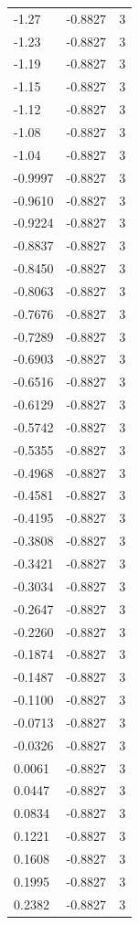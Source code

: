 \begin{longtable}{lrr}
  -1.27 & -0.8827 & 3 \\
  -1.23 & -0.8827 & 3 \\
  -1.19 & -0.8827 & 3 \\
  -1.15 & -0.8827 & 3 \\
  -1.12 & -0.8827 & 3 \\
  -1.08 & -0.8827 & 3 \\
  -1.04 & -0.8827 & 3 \\
  -0.9997 & -0.8827 & 3 \\
  -0.9610 & -0.8827 & 3 \\
  -0.9224 & -0.8827 & 3 \\
  -0.8837 & -0.8827 & 3 \\
  -0.8450 & -0.8827 & 3 \\
  -0.8063 & -0.8827 & 3 \\
  -0.7676 & -0.8827 & 3 \\
  -0.7289 & -0.8827 & 3 \\
  -0.6903 & -0.8827 & 3 \\
  -0.6516 & -0.8827 & 3 \\
  -0.6129 & -0.8827 & 3 \\
  -0.5742 & -0.8827 & 3 \\
  -0.5355 & -0.8827 & 3 \\
  -0.4968 & -0.8827 & 3 \\
  -0.4581 & -0.8827 & 3 \\
  -0.4195 & -0.8827 & 3 \\
  -0.3808 & -0.8827 & 3 \\
  -0.3421 & -0.8827 & 3 \\
  -0.3034 & -0.8827 & 3 \\
  -0.2647 & -0.8827 & 3 \\
  -0.2260 & -0.8827 & 3 \\
  -0.1874 & -0.8827 & 3 \\
  -0.1487 & -0.8827 & 3 \\
  -0.1100 & -0.8827 & 3 \\
  -0.0713 & -0.8827 & 3 \\
  -0.0326 & -0.8827 & 3 \\
  0.0061 & -0.8827 & 3 \\
  0.0447 & -0.8827 & 3 \\
  0.0834 & -0.8827 & 3 \\
  0.1221 & -0.8827 & 3 \\
  0.1608 & -0.8827 & 3 \\
  0.1995 & -0.8827 & 3 \\
  0.2382 & -0.8827 & 3 \\

\end{longtable}
